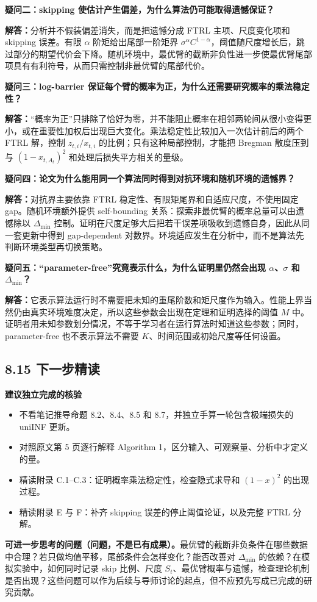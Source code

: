 \textbf{疑问二：skipping 使估计产生偏差，为什么算法仍可能取得遗憾保证？}

\textbf{解答：}分析并不假装偏差消失，而是把遗憾分成 FTRL 主项、尺度变化项和 skipping 误差。有限 $\alpha$ 阶矩给出尾部一阶矩界 $\sigma^\alpha C^{1-\alpha}$，阈值随尺度增长后，跳过部分的期望代价会下降。随机环境中，最优臂的截断非负性进一步使最优臂尾部项具有有利符号，从而只需控制非最优臂的尾部代价。

\textbf{疑问三：log-barrier 保证每个臂的概率为正，为什么还需要研究概率的乘法稳定性？}

\textbf{解答：}“概率为正”只排除了恰好为零，并不能阻止概率在相邻两轮间从很小变得更小，或在重要性加权后出现巨大变化。乘法稳定性比较加入一次估计前后的两个 FTRL 解，控制 $z_{t,i}/x_{t,i}$ 的比例；只有这种局部控制，才能把 Bregman 散度压到与 $(1-x_{t,A_t})^2$ 和处理后损失平方相关的量级。

\textbf{疑问四：论文为什么能用同一个算法同时得到对抗环境和随机环境的遗憾界？}

\textbf{解答：}对抗界主要依靠 FTRL 稳定性、有限矩尾界和自适应尺度，不使用固定 gap。随机环境额外提供 self-bounding 关系：探索非最优臂的概率总量可以由遗憾除以 $\Delta_{\min}$ 控制。证明在尺度足够大后把若干误差项吸收到遗憾自身，因此从同一套更新中得到 gap-dependent 对数界。环境适应发生在分析中，而不是算法先判断环境类型再切换策略。

\textbf{疑问五：“parameter-free”究竟表示什么，为什么证明里仍然会出现 $\alpha$、$\sigma$ 和 $\Delta_{\min}$？}

\textbf{解答：}它表示算法运行时不需要把未知的重尾阶数和矩尺度作为输入。性能上界当然仍由真实环境难度决定，所以这些参数会出现在定理和证明选择的阈值 $M$ 中。证明者用未知参数划分情况，不等于学习者在运行算法时知道这些参数；同时，parameter-free 也不表示算法不需要 $K$、时间范围或初始尺度等任何设置。

\subsection{8.15 下一步精读}

\textbf{建议独立完成的核验}
\begin{itemize}
\item 不看笔记推导命题 8.2、8.4、8.5 和 8.7，并独立手算一轮包含极端损失的 uniINF 更新。
\item 对照原文第 5 页逐行解释 Algorithm 1，区分输入、可观察量、分析中才定义的量。
\item 精读附录 C.1--C.3：证明概率乘法稳定性，检查隐式求导和 $(1-x)^2$ 的出现过程。
\item 精读附录 E 与 F：补齐 skipping 误差的停止阈值论证，以及完整 FTRL 分解。
\end{itemize}

\textbf{可进一步思考的问题（问题，不是已有成果）。}最优臂的截断非负条件在哪些数据中合理？若只做均值平移，尾部条件会怎样变化？能否改善对 $\Delta_{\min}$ 的依赖？在模拟实验中，如何同时记录 skip 比例、尺度 $S_t$、最优臂概率与遗憾，检查理论机制是否出现？这些问题可以作为后续与导师讨论的起点，但不应预先写成已完成的研究贡献。
